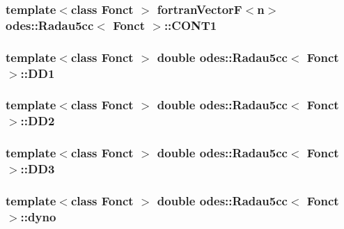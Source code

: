 \subsubsection[{C\+O\+N\+T1}]{\setlength{\rightskip}{0pt plus 5cm}template$<$class Fonct $>$ {\bf fortran\+Vector\+F}$<${\bf n}$>$ {\bf odes\+::\+Radau5cc}$<$ Fonct $>$\+::C\+O\+N\+T1\hspace{0.3cm}{\ttfamily [private]}}\label{classodes_1_1Radau5cc_ae99cd8b33b1370b4b2dddb0361d6bb1e}
\hypertarget{classodes_1_1Radau5cc_a9a211ff738351641da6cdd159917fef2}{}
\subsubsection[{D\+D1}]{\setlength{\rightskip}{0pt plus 5cm}template$<$class Fonct $>$ double {\bf odes\+::\+Radau5cc}$<$ Fonct $>$\+::D\+D1\hspace{0.3cm}{\ttfamily [private]}}\label{classodes_1_1Radau5cc_a9a211ff738351641da6cdd159917fef2}
\hypertarget{classodes_1_1Radau5cc_a86933b385c18f7ff7072da61f03daf05}{}
\subsubsection[{D\+D2}]{\setlength{\rightskip}{0pt plus 5cm}template$<$class Fonct $>$ double {\bf odes\+::\+Radau5cc}$<$ Fonct $>$\+::D\+D2\hspace{0.3cm}{\ttfamily [private]}}\label{classodes_1_1Radau5cc_a86933b385c18f7ff7072da61f03daf05}
\hypertarget{classodes_1_1Radau5cc_a1c94a1f803b67e35bbed88d6152d1fff}{}
\subsubsection[{D\+D3}]{\setlength{\rightskip}{0pt plus 5cm}template$<$class Fonct $>$ double {\bf odes\+::\+Radau5cc}$<$ Fonct $>$\+::D\+D3\hspace{0.3cm}{\ttfamily [private]}}\label{classodes_1_1Radau5cc_a1c94a1f803b67e35bbed88d6152d1fff}
\hypertarget{classodes_1_1Radau5cc_a36cb3bec1d0c8e1f6ea23eec088d5fa7}{}
\subsubsection[{dyno}]{\setlength{\rightskip}{0pt plus 5cm}template$<$class Fonct $>$ double {\bf odes\+::\+Radau5cc}$<$ Fonct $>$\+::dyno\hspace{0.3cm}{\ttfamily [private]}}\label{classodes_1_1Radau5cc_a36cb3bec1d0c8e1f6ea23eec088d5fa7}
\hypertarget{classodes_1_1Radau5cc_a5d60671c8cf94cc855a57a2afe201565}{}
